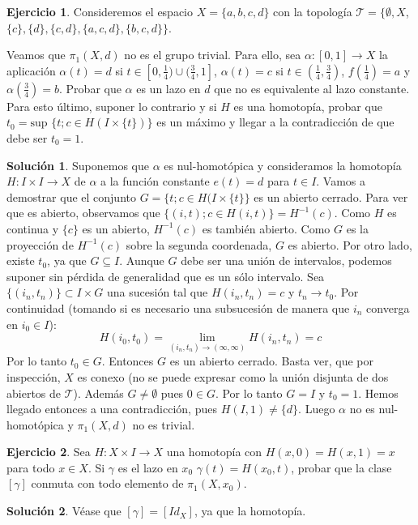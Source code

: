 \documentclass{article}
\theoremstyle{plain}
\theoremstyle{definition}
\newtheorem{exercise}{Ejercicio}
\newtheorem*{sol*}{Solución}
\begin{document}
\newpage \begin{exercise} Consideremos el espacio $X = \{a,b,c,d\}$ con la topología $\mathcal{T} = \{\emptyset, X$, $\{c\},\{d\}, \{c,d\}, \{a,c,d\}, \{b,c,d\}\}$.
\par
 Veamos que $\pi_1(X,d)$ no es el grupo trivial. Para ello, sea $\alpha: [0,1]\to X$ la aplicación $\alpha(t) = d$ si $t \in [0,\frac{1}{4}) \cup (\frac{3}{4},1]$, $\alpha(t) = c$ si $t\in (\frac{1}{4},\frac{3}{4})$, $f(\frac{1}{4}) = a$ y $\alpha(\frac{3}{4}) = b$.  Probar que $\alpha$ es un lazo en $d$ que no es equivalente al lazo constante. Para esto último, suponer lo contrario y si $H$ es una homotopía, probar que $t_0 = \mbox{sup }\{t; c\in H(I\times \{t\})\}$ es un máximo y llegar a la contradicción de que debe ser $t_0 = 1$.
\end{exercise}
\begin{sol*}
Suponemos que $\alpha$ es nul-homotópica y consideramos la homotopía $H : I \times I \to X$  de $\alpha$ a la función constante $e(t)=d$ para $t \in I$.
Vamos a demostrar que el conjunto $G = \{t ; c \in H(I \times \{t\}\}$ es un abierto cerrado. Para ver que es abierto, observamos que $\{(i,t) ; c \in H(i,t)\} = H^{-1}({c})$. Como $H$ es continua y $\{c\}$ es un abierto, $H^{-1}({c})$ es también abierto. Como $G$ es la proyección de $H^{-1}(c)$ sobre la segunda coordenada, $G$ es abierto. Por otro lado, existe $t_0$, ya que $G \subseteq I$. Aunque $G$ debe ser una unión de intervalos, podemos suponer sin pérdida de generalidad que es un sólo intervalo. Sea $\{(i_n,t_n)\}\subset I\times G$ una sucesión tal que $H(i_n,t_n) = c$ y $t_n \to t_0$. Por continuidad (tomando si es necesario una subsucesión de manera que $i_n$ converga en $i_0 \in I$):
\[ H(i_0,t_0) = \lim\limits_{(i_n,t_n)\to (\infty,\infty)}H(i_n,t_n) = c \]
Por lo tanto $t_0 \in G$. Entonces $G$ es un abierto cerrado. Basta ver, que por inspección, $X$ es conexo (no se puede expresar como la unión disjunta de dos abiertos de $\mathcal{T}$). Además $G\neq\emptyset$ pues $0\in G$. Por lo tanto $G = I$ y $t_0 = 1$. Hemos llegado entonces a una contradicción, pues $H(I,1) \neq \{d\}$. Luego $\alpha$ no es nul-homotópica y $\pi_1(X,d)$ no es trivial.
\end{sol*}

\newpage \begin{exercise} Sea $H: X\times I \to X$ una homotopía con $H(x,0) =  H(x,1) = x$ para todo $x\in X$. Si $\gamma$ es el lazo en $x_0$ $\gamma(t) = H(x_0,t)$, probar que la clase $[\gamma]$ conmuta con todo elemento de $\pi_1(X,x_0)$.
\end{exercise}
\begin{sol*} Véase que $[\gamma]=[Id_X]$, ya que la homotopía.
\end{sol*}
\end{document}

